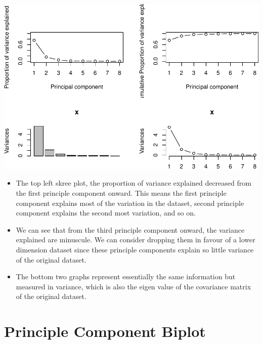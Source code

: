 \documentclass[]{article}
\begin{document}
\begin{center}\includegraphics{Assignment_3_files/figure-latex/unnamed-chunk-7-1} \end{center}

\begin{itemize}
\item
  The top left skree plot, the proportion of variance explained
  decreased from the first principle component onward. This means the
  first principle component explains most of the variation in the
  dataset, second principle component explains the second most
  variation, and so on.
\item
  We can see that from the third principle component onward, the
  variance explained are minuscule. We can consider dropping them in
  favour of a lower dimension dataset since these principle components
  explain so little variance of the original dataset.
\item
  The bottom two graphs represent essentially the same information but
  measured in variance, which is also the eigen value of the covariance
  matrix of the original dataset.
\end{itemize}

\section{Principle Component Biplot}\label{principle-component-biplot}
\end{document}

